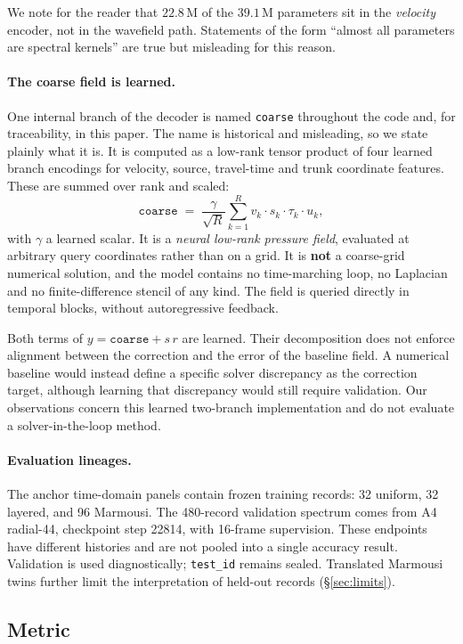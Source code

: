 \documentclass[11pt,a4paper]{article}
\begin{document}
We note for the reader that $22.8$\,M of the $39.1$\,M parameters sit in the \emph{velocity}
encoder, not in the wavefield path. Statements of the form ``almost all parameters are
spectral kernels'' are true but misleading for this reason.

\paragraph{The coarse field is learned.}
One internal branch of the decoder is named \texttt{coarse} throughout the code and, for
traceability, in this paper. The name is historical and misleading, so we state plainly what it
is. It is computed as a low-rank tensor product of four learned branch encodings for
velocity, source, travel-time and trunk coordinate features. These are summed over rank and scaled:
\[
\texttt{coarse} \;=\; \frac{\gamma}{\sqrt{R}}\sum_{k=1}^{R}
v_k \cdot s_k \cdot \tau_k \cdot u_k ,
\]
with $\gamma$ a learned scalar. It is a \emph{neural low-rank pressure field}, evaluated at
arbitrary query coordinates rather than on a grid. It is \textbf{not} a coarse-grid numerical
solution, and the model contains no time-marching loop, no Laplacian and no finite-difference
stencil of any kind. The field is queried directly in temporal blocks, without autoregressive feedback.

Both terms of $y = \texttt{coarse} + s\,r$ are learned. Their decomposition does not enforce
alignment between the correction and the error of the baseline field. A numerical baseline
would instead define a specific solver discrepancy as the correction target, although learning
that discrepancy would still require validation. Our observations concern this learned
two-branch implementation and do not evaluate a solver-in-the-loop method.

\paragraph{Evaluation lineages.}
The anchor time-domain panels contain frozen training records: 32 uniform, 32 layered, and
96 Marmousi. The 480-record validation spectrum comes from A4 radial-44, checkpoint step 22814,
with 16-frame supervision. These endpoints have different histories and are not pooled into
a single accuracy result. Validation is used diagnostically; \texttt{test\_id} remains sealed.
Translated Marmousi twins further limit the interpretation of held-out records
(\S\ref{sec:limits}).

\subsection{Metric}
\label{sec:setting-metric}
\end{document}
